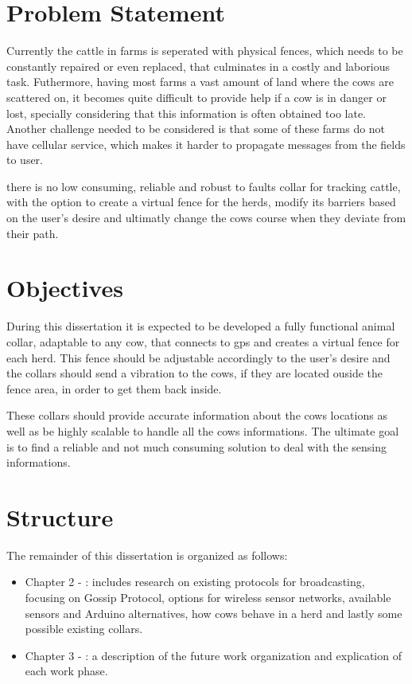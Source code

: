 \section{Problem Statement}
\label{sec:problem_statement}
Currently the cattle in farms is seperated with physical fences, which needs to be constantly
repaired or even replaced, that culminates in a costly and laborious task. Futhermore, having
most farms a vast amount of land where the cows are scattered on, it becomes quite difficult to
provide help if a cow is in danger or lost, specially considering that this information is
often obtained too late. Another challenge needed to be considered is that some of these farms
do not have cellular service, which makes it harder to propagate messages from the fields to
user.


there is no low consuming, reliable and robust to faults collar for tracking cattle,
with the option to create a virtual fence for the herds, modify its barriers based on the
user's desire and ultimatly change the cows course when they deviate from their path.

\section{Objectives}
\label{sec:objectives}
During this dissertation it is expected to be developed a fully functional animal collar,
adaptable to any cow, that connects to gps and creates a virtual fence for each herd. This
fence should be adjustable accordingly to the user's desire and the collars should send a
vibration to the cows, if they are located ouside the fence area, in order to get them back
inside.

These collars should provide accurate information about the cows locations as well
as be highly scalable to handle all the cows informations. The ultimate goal is to find a
reliable and not much consuming solution to deal with the sensing informations.



\section{Structure}
\label{sec:structure}
The remainder of this dissertation is organized as follows:
\begin{itemize}
      \item Chapter 2 - : includes research on existing
            protocols for broadcasting, focusing on Gossip Protocol, options for wireless
            sensor networks, available sensors and Arduino alternatives, how cows behave
            in a herd and lastly some possible existing collars.
      \item Chapter 3 - : a description of the future work
            organization and explication of each work phase.
\end{itemize}
